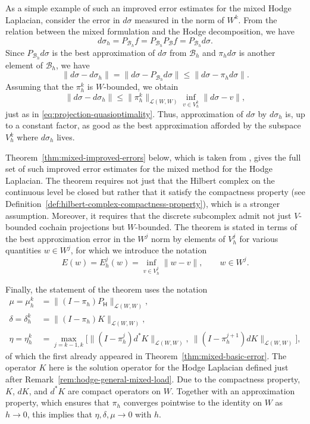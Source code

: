 {As a simple example of such an improved error estimates for the mixed Hodge Laplacian, consider the error in $d\sigma$ measured in the norm of $W^k$. From the relation between the mixed formulation and the Hodge decomposition, we have}
\[
d\sigma_h=P_{\mathcal B_h}f=P_{\mathcal B_h}P_{\mathcal B}f=P_{\mathcal B_h}d\sigma.
\]
{Since $P_{\mathcal B_h}d\sigma$ is the best approximation of $d\sigma$ from $\mathcal B_h$ and $\pi_hd\sigma$ is another element of $\mathcal B_h$, we have}
\[
\|d\sigma-d\sigma_h\|=\|d\sigma-P_{\mathcal B_h}d\sigma\|\leq\|d\sigma-\pi_hd\sigma\|.
\]
{Assuming that the $\pi_h^k$ is $W$-bounded, we obtain}
\[
\|d\sigma-d\sigma_h\|\leq\|\pi_h^k\|_{\mathcal L(W,W)}\inf_{v\in V_h^k}\|d\sigma-v\|,
\]
{just as in \eqref{eq:projection-quasioptimality}. Thus, approximation of $d\sigma$ by $d\sigma_h$ is, up to a constant factor, as good as the best approximation afforded by the subspace $V_h^k$ where $d\sigma_h$ lives.}

{Theorem~\ref{thm:mixed-improved-errors} below, which is taken from , gives the full set of such improved error estimates for the mixed method for the Hodge Laplacian. The theorem requires not just that the Hilbert complex on the continuous level be closed but rather that it satisfy the compactness property (see Definition~\ref{def:hilbert-complex-compactness-property}), which is a stronger assumption. Moreover, it requires that the discrete subcomplex admit not just $V$-bounded cochain projections but $W$-bounded. The theorem is stated in terms of the best approximation error in the $W^j$ norm by elements of $V_h^j$ for various quantities $w\in W^j$, for which we introduce the notation}
\[
E(w)=E_h^j(w)=\inf_{v\in V_h^j}\|w-v\|,\qquad w\in W^j.
\]

{Finally, the statement of the theorem uses the notation}
\[
\begin{aligned}
\mu=\mu_h^k&=\|(I-\pi_h)P_{\mathsf H}\|_{\mathcal L(W,W)},\\
\delta=\delta_h^k&=\|(I-\pi_h)K\|_{\mathcal L(W,W)},\\
\eta=\eta_h^k&=\max_{j=k-1,k}\big[\|(I-\pi_h^j)d^*K\|_{\mathcal L(W,W)},\ \|(I-\pi_h^{j+1})dK\|_{\mathcal L(W,W)}\big],
\end{aligned}
\]
{of which the first already appeared in Theorem~\ref{thm:mixed-basic-error}. The operator $K$ here is the solution operator for the Hodge Laplacian defined just after Remark~\ref{rem:hodge-general-mixed-load}. Due to the compactness property, $K$, $dK$, and $d^*K$ are compact operators on $W$. Together with an approximation property, which ensures that $\pi_h$ converges pointwise to the identity on $W$ as $h\to0$, this implies that $\eta,\delta,\mu\to0$ with $h$.}

